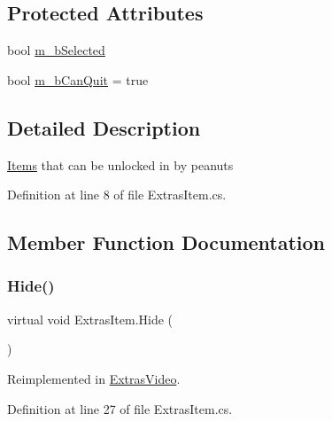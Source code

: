 \subsection*{Protected Attributes}
\begin{DoxyCompactItemize}
\item 
bool \mbox{\hyperlink{class_extras_item_a0532ece4d85246830027fc046eadbc61}{m\+\_\+b\+Selected}}
\item 
bool \mbox{\hyperlink{class_extras_item_a3310a3d2f1ad04ce95296649223a811e}{m\+\_\+b\+Can\+Quit}} = true
\end{DoxyCompactItemize}


\subsection{Detailed Description}
\mbox{\hyperlink{class_items}{Items}} that can be unlocked in by peanuts 



Definition at line 8 of file Extras\+Item.\+cs.



\subsection{Member Function Documentation}
\mbox{\label{class_extras_item_ac209e4ed8ec16d9ad9f24eba19057fe2}} 
\subsubsection{\texorpdfstring{Hide()}{Hide()}}
{\footnotesize\ttfamily virtual void Extras\+Item.\+Hide (\begin{DoxyParamCaption}{ }\end{DoxyParamCaption})\hspace{0.3cm}{\ttfamily [virtual]}}



Reimplemented in \mbox{\hyperlink{class_extras_video_a546c420f0653ab38b223e6bb11e805ee}{Extras\+Video}}.



Definition at line 27 of file Extras\+Item.\+cs.

\mbox{\label{class_extras_item_ae6382773509ab96a451613b5bcaee0d8}} 
